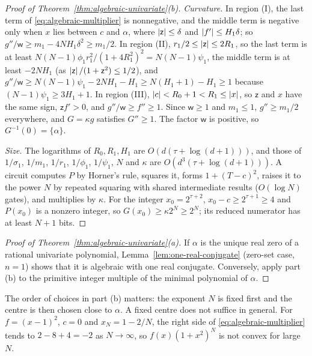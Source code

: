 \begin{proof}[Proof of Theorem~\ref{thm:algebraic-univariate}(b)]
\emph{Curvature.} In region (I), the last term of
\eqref{eq:algebraic-multiplier} is nonnegative, and the middle term is
negative only when $x$ lies between $c$ and $\alpha$, where
$\left\lvert\mathsf z\right\rvert\le\delta$ and $\left\lvert f'\right\rvert\le H_1\delta$; so
$g''/\mathsf w\ge m_1-4NH_1\delta^2\ge m_1/2$. In region (II),
$r_1/2\le\left\lvert\mathsf z\right\rvert\le2R_1$, so the last term is at least
$N(N-1)\phi_1r_1^2/(1+4R_1^2)^2=N(N-1)\psi_1$, the middle term is at least
$-2NH_1$ (as $\left\lvert\mathsf z\right\rvert/(1+\mathsf z^2)\le1/2$), and
$g''/\mathsf w\ge N(N-1)\psi_1-2NH_1-H_1\ge N(H_1+1)-H_1\ge1$ because
$(N-1)\psi_1\ge3H_1+1$. In region (III), $\left\lvert c\right\rvert<R_0+1<R_1\le\left\lvert x\right\rvert$, so
$\mathsf z$ and $x$ have the same sign, $\mathsf zf'>0$, and
$g''/\mathsf w\ge f''\ge1$. Since $\mathsf w\ge1$ and $m_1\le1$,
$g''\ge m_1/2$ everywhere, and $G=\kappa g$ satisfies $G''\ge1$. The factor
$\mathsf w$ is positive, so $G^{-1}(0)=\{\alpha\}$.

\emph{Size.} The logarithms of $R_0,R_1,H_1$ are $O(d(\tau+\log(d+1)))$, and
those of $1/\sigma_1$, $1/m_1$, $1/r_1$, $1/\phi_1$, $1/\psi_1$, $N$ and $\kappa$
are $O(d^3(\tau+\log(d+1)))$. A circuit computes $P$ by Horner's rule, squares
it, forms $1+(T-c)^2$, raises it to the power $N$ by repeated squaring with
shared intermediate results ($O(\log N)$ gates), and multiplies by $\kappa$.
For the integer $x_0=2^{\tau+2}$, $x_0-c\ge2^{\tau+1}\ge4$ and $P(x_0)$ is a
nonzero integer, so $G(x_0)\ge\kappa2^N\ge2^N$; its reduced numerator has at
least $N+1$ bits.
\end{proof}

\begin{proof}[Proof of Theorem~\ref{thm:algebraic-univariate}(a)]
If $\alpha$ is the unique real zero of a rational univariate polynomial,
Lemma~\ref{lem:one-real-conjugate} (zero-set case, $n=1$) shows that it is
algebraic with one real conjugate. Conversely, apply part (b) to the primitive
integer multiple of the minimal polynomial of $\alpha$.
\end{proof}

The order of choices in part (b) matters: the exponent $N$ is fixed first and
the centre is then chosen close to $\alpha$. A fixed centre does not suffice in
general. For $f=(x-1)^2$, $c=0$ and $x_N=1-2/N$, the right side of
\eqref{eq:algebraic-multiplier} tends to $2-8+4=-2$ as $N\to\infty$, so
$f(x)(1+x^2)^N$ is not convex for large $N$.

